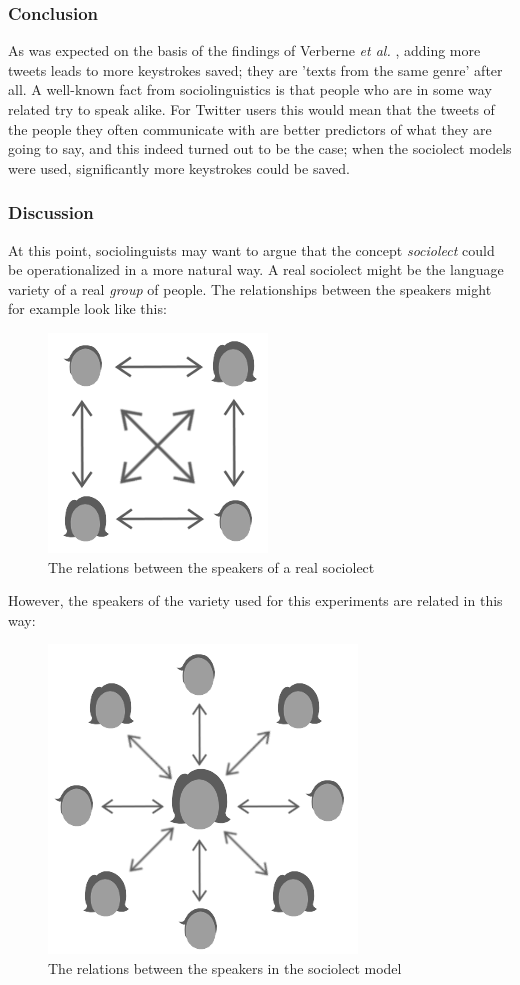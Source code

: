 \documentclass[11pt]{article}
\begin{document}
\subsubsection{Conclusion}
As was expected on the basis of the findings of Verberne {\em et al.} , adding more tweets leads to more keystrokes saved; they are 'texts from the same genre' after all. A well-known fact from sociolinguistics is that people who are in some way related try to speak alike. For Twitter users this would mean that the tweets of the people they often communicate with are better predictors of what they are going to say, and this indeed turned out to be the case; when the sociolect models were used, significantly more keystrokes could be saved.


\subsubsection{Discussion}
At this point, sociolinguists may want to argue that the concept \emph{sociolect} could be operationalized in a more natural way. A real sociolect might be the language variety of a real \emph{group} of people. The relationships between the speakers might for example look like this:

\begin{figure}[H] \centering
\includegraphics[scale=0.75]{real_network}
\caption{The relations between the speakers of a real sociolect}
\end{figure} 

However, the speakers of the variety used for this experiments are related in this way:

\begin{figure}[H] \centering
\includegraphics[scale=0.75]{sloppy_network}
\caption{The relations between the speakers in the sociolect model}
\end{figure} 
\end{document}
